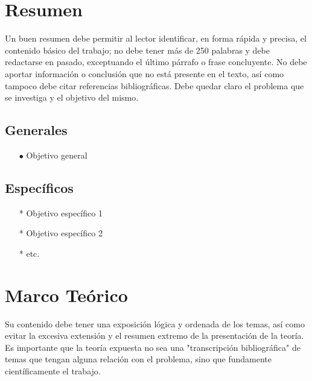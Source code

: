 \documentclass[osajnl,showpacs,superscriptaddress,10pt]{article}
\begin{document}
\setlength{\columnsep}{1cm}
\begin{multicols}{2}

\section{Resumen}

Un buen resumen debe permitir al lector identificar, en forma rápida y precisa, el contenido básico del trabajo; no debe tener más de 250 palabras y debe redactarse en pasado, exceptuando el último párrafo o frase concluyente. No debe aportar información o conclusión que no está presente en el texto, así como tampoco debe citar referencias bibliográficas. Debe quedar claro el problema que se investiga y el objetivo del mismo.


\subsection{Generales}

\begin{itemize}
    \item[$\bullet$] Objetivo general
\end{itemize}

\subsection{Específicos}

\begin{itemize}
    \item[*] Objetivo específico 1
    \item[*] Objetivo específico 2
    \item[*] etc.
\end{itemize}
 
\section{Marco Teórico}

    Su contenido debe tener una exposición lógica y ordenada de los temas, así como evitar la excesiva extensión y el resumen extremo de la presentación de la teoría. Es importante que la teoría expuesta no sea una "transcripción bibliográfica" de temas que tengan alguna relación con el problema, sino que fundamente científicamente el trabajo.\\


\end{multicols}
\end{document}
